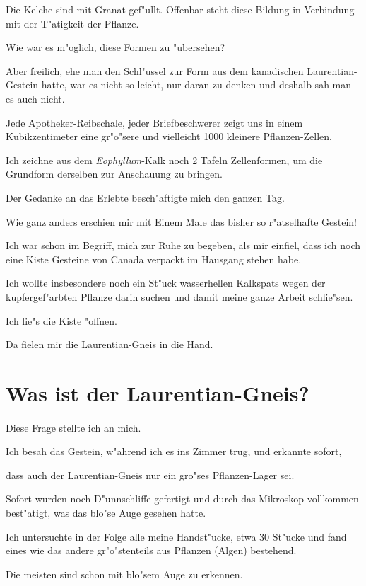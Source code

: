 \documentclass[a4paper, 11pt, oneside, german]{article}
\begin{document}
Die Kelche sind mit Granat gef"ullt. Offenbar steht diese Bildung in Verbindung mit der T"atigkeit der Pflanze.

Wie war es m"oglich, diese Formen zu "ubersehen?

Aber freilich, ehe man den Schl"ussel zur Form aus dem kanadischen Laurentian-Gestein hatte, war es nicht so leicht, nur daran zu denken und deshalb sah man es auch nicht.

Jede Apotheker-Reibschale, jeder Briefbeschwerer zeigt uns in einem Kubikzentimeter eine gr"o"sere und vielleicht 1000 kleinere Pflanzen-Zellen.

Ich zeichne aus dem \emph{Eophyllum}-Kalk noch 2 Tafeln Zellenformen, um die Grundform derselben zur Anschauung zu bringen.

Der Gedanke an das Erlebte besch"aftigte mich den ganzen Tag.

Wie ganz anders erschien mir mit Einem Male das bisher so r"atselhafte Gestein!

Ich war schon im Begriff, mich zur Ruhe zu begeben, als mir einfiel, dass ich noch eine Kiste Gesteine von Canada verpackt im Hausgang stehen habe.

Ich wollte insbesondere noch ein St"uck wasserhellen Kalkspats wegen der kupfergef"arbten Pflanze darin suchen und damit meine ganze Arbeit schlie"sen.

Ich lie"s die Kiste "offnen.

Da fielen mir die Laurentian-Gneis in die Hand.
\clearpage
\section{Was ist der Laurentian-Gneis?}
\paragraph{}
Diese Frage stellte ich an mich.

Ich besah das Gestein, w"ahrend ich es ins Zimmer trug, und erkannte sofort,

dass auch der Laurentian-Gneis nur ein gro"ses Pflanzen-Lager sei.

Sofort wurden noch D"unnschliffe gefertigt und durch das Mikroskop vollkommen best"atigt, was das blo"se Auge gesehen hatte.

Ich untersuchte in der Folge alle meine Handst"ucke, etwa 30 St"ucke und fand eines wie das andere gr"o"stenteils aus Pflanzen (Algen) bestehend.

Die meisten sind schon mit blo"sem Auge zu erkennen.
\end{document}
